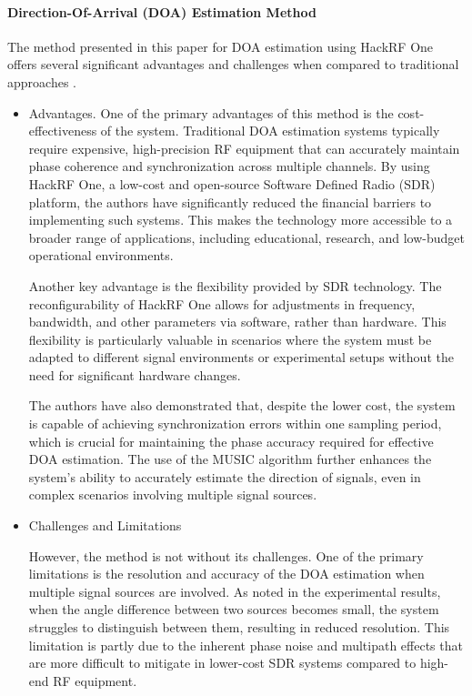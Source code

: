 \paragraph{Direction-Of-Arrival (DOA) Estimation Method}

The method presented in this paper for DOA estimation using HackRF One offers several significant advantages and challenges when compared to traditional approaches \cite{zhang2022implementation}.

\begin{itemize}
	\item {Advantages.}
	One of the primary advantages of this method is the cost-effectiveness of the system. Traditional DOA estimation systems typically require expensive, high-precision RF equipment that can accurately maintain phase coherence and synchronization across multiple channels. By using HackRF One, a low-cost and open-source Software Defined Radio (SDR) platform, the authors have significantly reduced the financial barriers to implementing such systems. This makes the technology more accessible to a broader range of applications, including educational, research, and low-budget operational environments.
	
	Another key advantage is the flexibility provided by SDR technology. The reconfigurability of HackRF One allows for adjustments in frequency, bandwidth, and other parameters via software, rather than hardware. This flexibility is particularly valuable in scenarios where the system must be adapted to different signal environments or experimental setups without the need for significant hardware changes.
	
	The authors have also demonstrated that, despite the lower cost, the system is capable of achieving synchronization errors within one sampling period, which is crucial for maintaining the phase accuracy required for effective DOA estimation. The use of the MUSIC algorithm further enhances the system's ability to accurately estimate the direction of signals, even in complex scenarios involving multiple signal sources.
	
	\item {Challenges and Limitations}
	
	However, the method is not without its challenges. One of the primary limitations is the resolution and accuracy of the DOA estimation when multiple signal sources are involved. As noted in the experimental results, when the angle difference between two sources becomes small, the system struggles to distinguish between them, resulting in reduced resolution. This limitation is partly due to the inherent phase noise and multipath effects that are more difficult to mitigate in lower-cost SDR systems compared to high-end RF equipment.
	

\end{itemize}
